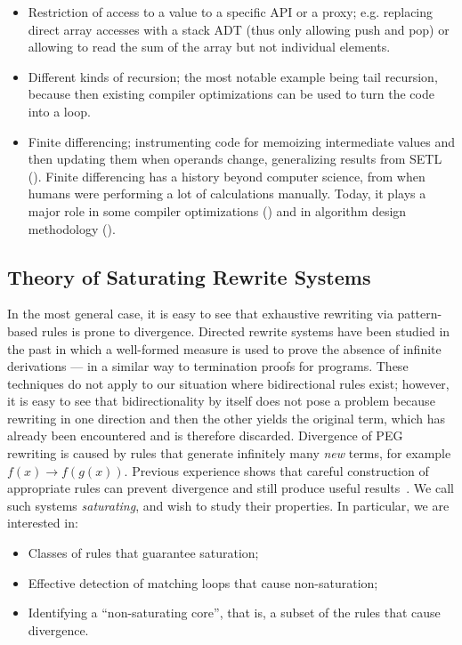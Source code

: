 \begin{itemize}
  \item Restriction of access to a value to a specific API or a proxy;
    e.g. replacing direct array accesses with a stack ADT (thus only allowing push and pop)
    or allowing to read the sum of the array but not individual elements.
  \item Different kinds of recursion; the most notable example being
    tail recursion, because then existing compiler optimizations can be
    used to turn the code into a loop.
  \item Finite differencing; instrumenting code for memoizing intermediate
    values and then updating them when operands change, generalizing results
    from SETL (\cite{TOPLAS1982/Paige,ESOP1990/Paige}).
    Finite differencing has a history beyond computer science, from when
    humans were performing a lot of calculations manually.
    Today, it plays a major role in some compiler optimizations
    (\cite{CACM1997/Cocke})
    and in algorithm design methodology (\cite{Book1997/Dijkstra,VHLL1974/Earley}).
\end{itemize}

\subsection{Theory of Saturating Rewrite Systems}

In the most general case, it is easy to see that exhaustive rewriting via
pattern-based rules is prone to divergence.
Directed rewrite systems have been studied in the past in which a well-formed
measure is used to prove the absence of infinite derivations --- in a similar
way to termination proofs for programs.
These techniques do not apply to our situation where bidirectional rules exist;
however, it is easy to see that bidirectionality by itself does not pose a
problem because rewriting in one direction and then the other yields the
original term, which has already been encountered and is therefore discarded.
Divergence of PEG rewriting is caused by rules that generate infinitely many
\emph{new} terms, for example $f(x) \to f(g(x))$.
Previous experience shows that careful construction of appropriate rules can
prevent divergence and still produce useful results~\cite{LPAR2013/Itzhaky}.
We call such systems \emph{saturating}, and wish to study their properties.
In particular, we are interested in:
\begin{itemize}
  \item Classes of rules that guarantee saturation;
  \item Effective detection of matching loops that cause non-saturation;
  \item Identifying a ``non-saturating core'', that is, a subset of the
    rules that cause divergence. 
\end{itemize}

